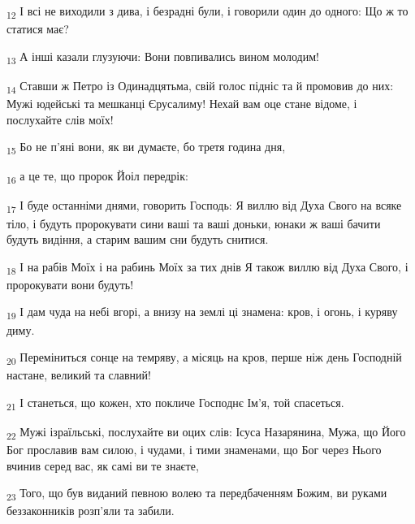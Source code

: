 \begin{tcolorbox}
\textsubscript{12} І всі не виходили з дива, і безрадні були, і говорили один до одного: Що ж то статися має?
\end{tcolorbox}
\begin{tcolorbox}
\textsubscript{13} А інші казали глузуючи: Вони повпивались вином молодим!
\end{tcolorbox}
\begin{tcolorbox}
\textsubscript{14} Ставши ж Петро із Одинадцятьма, свій голос підніс та й промовив до них: Мужі юдейські та мешканці Єрусалиму! Нехай вам оце стане відоме, і послухайте слів моїх!
\end{tcolorbox}
\begin{tcolorbox}
\textsubscript{15} Бо не п'яні вони, як ви думаєте, бо третя година дня,
\end{tcolorbox}
\begin{tcolorbox}
\textsubscript{16} а це те, що пророк Йоіл передрік:
\end{tcolorbox}
\begin{tcolorbox}
\textsubscript{17} І буде останніми днями, говорить Господь: Я виллю від Духа Свого на всяке тіло, і будуть пророкувати сини ваші та ваші доньки, юнаки ж ваші бачити будуть видіння, а старим вашим сни будуть снитися.
\end{tcolorbox}
\begin{tcolorbox}
\textsubscript{18} І на рабів Моїх і на рабинь Моїх за тих днів Я також виллю від Духа Свого, і пророкувати вони будуть!
\end{tcolorbox}
\begin{tcolorbox}
\textsubscript{19} І дам чуда на небі вгорі, а внизу на землі ці знамена: кров, і огонь, і куряву диму.
\end{tcolorbox}
\begin{tcolorbox}
\textsubscript{20} Переміниться сонце на темряву, а місяць на кров, перше ніж день Господній настане, великий та славний!
\end{tcolorbox}
\begin{tcolorbox}
\textsubscript{21} І станеться, що кожен, хто покличе Господнє Ім'я, той спасеться.
\end{tcolorbox}
\begin{tcolorbox}
\textsubscript{22} Мужі ізраїльські, послухайте ви оцих слів: Ісуса Назарянина, Мужа, що Його Бог прославив вам силою, і чудами, і тими знаменами, що Бог через Нього вчинив серед вас, як самі ви те знаєте,
\end{tcolorbox}
\begin{tcolorbox}
\textsubscript{23} Того, що був виданий певною волею та передбаченням Божим, ви руками беззаконників розп'яли та забили.
\end{tcolorbox}
